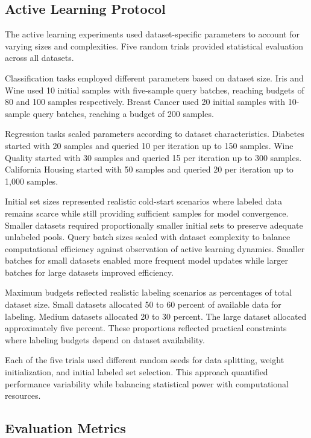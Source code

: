 \documentclass[conference]{IEEEtran}
\begin{document}
\subsection{Active Learning Protocol}

The active learning experiments used dataset-specific parameters to account for varying sizes and complexities. Five random trials provided statistical evaluation across all datasets.

Classification tasks employed different parameters based on dataset size. Iris and Wine used 10 initial samples with five-sample query batches, reaching budgets of 80 and 100 samples respectively. Breast Cancer used 20 initial samples with 10-sample query batches, reaching a budget of 200 samples.

Regression tasks scaled parameters according to dataset characteristics. Diabetes started with 20 samples and queried 10 per iteration up to 150 samples. Wine Quality started with 30 samples and queried 15 per iteration up to 300 samples. California Housing started with 50 samples and queried 20 per iteration up to 1,000 samples.

Initial set sizes represented realistic cold-start scenarios where labeled data remains scarce while still providing sufficient samples for model convergence. Smaller datasets required proportionally smaller initial sets to preserve adequate unlabeled pools. Query batch sizes scaled with dataset complexity to balance computational efficiency against observation of active learning dynamics. Smaller batches for small datasets enabled more frequent model updates while larger batches for large datasets improved efficiency.

Maximum budgets reflected realistic labeling scenarios as percentages of total dataset size. Small datasets allocated 50 to 60 percent of available data for labeling. Medium datasets allocated 20 to 30 percent. The large dataset allocated approximately five percent. These proportions reflected practical constraints where labeling budgets depend on dataset availability.

Each of the five trials used different random seeds for data splitting, weight initialization, and initial labeled set selection. This approach quantified performance variability while balancing statistical power with computational resources.

\subsection{Evaluation Metrics}
\end{document}
